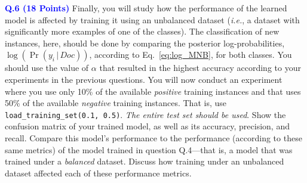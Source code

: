 \documentclass[letterpaper]{article}
\newcommand{\HIGHLIGHT}[1]{\textcolor{blue}{\textbf{#1}}}
\begin{document}
\noindent \HIGHLIGHT{Q.6 (18 Points)} Finally, you will study how the performance of the learned model is affected by training it using an unbalanced dataset (\textit{i.e.}, a dataset with significantly more examples of one of the classes). The classification of new instances, here, should be done by comparing the posterior log-probabilities, $\log(\Pr(y_i \, | \, Doc))$, according to Eq.~\eqref{eq:log_MNB}, for both classes. You should use the value of $\alpha$ that resulted in the highest accuracy according to your experiments in the previous questions. You will now conduct an experiment where you use only 10\% of the available \textit{positive} training instances and that uses  50\% of the available \textit{negative} training instances. That is, use \texttt{load\_training\_set(0.1, 0.5)}. \textit{The entire test set should be used}. Show the confusion matrix of your trained model, as well as its accuracy, precision, and recall. Compare this model's performance to the performance (according to these same metrics) of the model trained in question Q.4---that is, a model that was trained under a \textit{balanced} dataset. Discuss how training under an unbalanced dataset affected each of these performance metrics.
%
%
        
\end{document}
